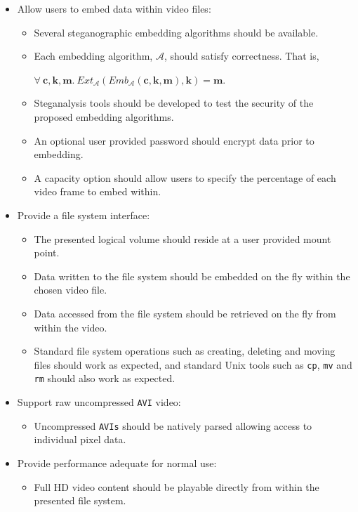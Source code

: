 \documentclass[paper=a4, fontsize=11pt,twoside]{scrartcl}    %
\numberwithin{table}{section}
\numberwithin{figure}{section}
\begin{document}
\begin{itemize}
\item Allow users to embed data within video files:
	\begin{itemize}
		\item Several steganographic embedding algorithms should be available.
		\item Each embedding algorithm, $\mathcal{A}$, should satisfy correctness. That is,\\ 
		\begin{center}
			$\forall ~\textbf{c}, \textbf{k}, \textbf{m}. ~Ext_{\mathcal{A}}(Emb_{\mathcal{A}}(\textbf{c}, \textbf{k}, \textbf{m}), \textbf{k}) = \textbf{m}$.
		\end{center}
		\item Steganalysis tools should be developed to test the security of the proposed embedding algorithms.
		\item An optional user provided password should encrypt data prior to embedding.
		\item A capacity option should allow users to specify the percentage of each video frame to embed within.
	\end{itemize}
\item Provide a file system interface:
	\begin{itemize}
		\item The presented logical volume should reside at a user provided mount point.		
		\item Data written to the file system should be embedded on the fly within the chosen video file.
		\item Data accessed from the file system should be retrieved on the fly from within the video.
		\item Standard file system operations such as creating, deleting and moving files should work as expected, and standard Unix tools such as \texttt{cp}, \texttt{mv} and \texttt{rm} should also work as expected.
	\end{itemize}	
\item Support raw uncompressed \texttt{AVI} video:
	\begin{itemize}
		\item Uncompressed \texttt{AVIs} should be natively parsed allowing access to individual pixel data.
	\end{itemize}	
\item Provide performance adequate for normal use:
	\begin{itemize}
		\item Full HD video content should be playable directly from within the presented file system.
	\end{itemize}		
\end{itemize}
\end{document}
